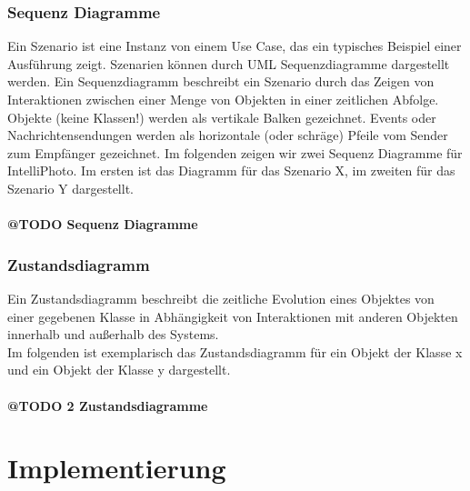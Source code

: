 \documentclass[11pt,a4paper]{article}
\begin{document}
\subsubsection{Sequenz Diagramme}
Ein Szenario ist eine Instanz von einem Use Case, das ein typisches Beispiel einer Ausführung zeigt.
Szenarien können durch UML Sequenzdiagramme dargestellt werden. Ein Sequenzdiagramm beschreibt ein Szenario durch das Zeigen von Interaktionen zwischen einer Menge von Objekten in einer zeitlichen Abfolge. Objekte (keine Klassen!) werden als vertikale Balken gezeichnet. Events oder Nachrichtensendungen werden als horizontale (oder schräge) Pfeile vom Sender zum Empfänger gezeichnet. Im folgenden zeigen wir zwei Sequenz Diagramme für IntelliPhoto. Im ersten ist das Diagramm für das Szenario X, im zweiten für das Szenario Y dargestellt.\\
\\
\textbf{@TODO Sequenz Diagramme}
\\

\subsubsection{Zustandsdiagramm}
Ein Zustandsdiagramm beschreibt die zeitliche Evolution eines Objektes von einer gegebenen Klasse
in Abhängigkeit von Interaktionen mit anderen Objekten innerhalb und außerhalb des Systems.\\
Im folgenden ist exemplarisch das Zustandsdiagramm für ein Objekt der Klasse x und ein Objekt der Klasse y dargestellt.\\
\\
\textbf{@TODO 2 Zustandsdiagramme}
\\




\section{Implementierung}
\end{document}
